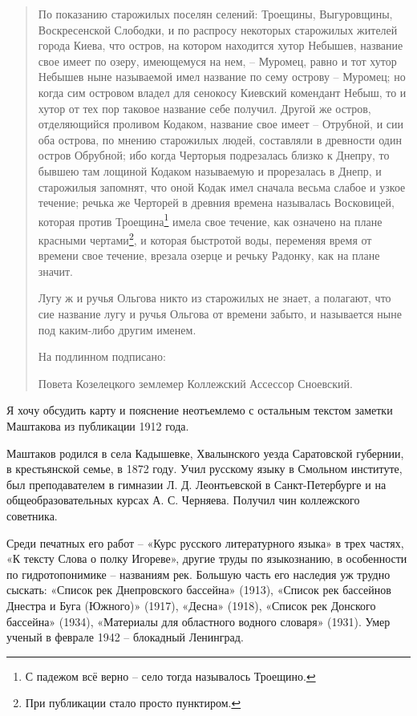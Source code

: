 \begin{quotation}
По показанию старожилых поселян селений: Троещины, Выгуровщины, Воскресенской Слободки, и по распросу некоторых старожилых жителей города Киева, что остров, на котором находится хутор Небышев, название свое имеет по озеру, имеющемуся на нем, – Муромец, равно и тот хутор Небышев ныне называемой имел название по сему острову – Муромец; но когда сим островом владел для сенокосу Киевский комендант Небыш, то и хутор от тех пор таковое название себе получил. Другой же остров, отделяющийся проливом Кодаком, название свое имеет – Отрубной, и сии оба острова, по мнению старожилых людей, составляли в древности один остров Обрубной; ибо когда Черторыя подрезалась близко к Днепру, то бывшею там лощиной Кодаком называемую и прорезалась в Днепр, и старожилыя запомнят, что оной Кодак имел сначала весьма слабое и узкое течение; речька же Черторей в древния времена называлась Восковицей, которая против Троещина\footnote{С падежом всё верно – село тогда называлось Троещино.} имела свое течение, как означено на плане красными чертами\footnote{При публикации стало просто пунктиром.}, и которая быстротой воды, переменяя время от времени свое течение, врезала озерце и речьку Радонку, как на плане значит.

Лугу ж и ручья Ольгова никто из старожилых не знает, а полагают, что сие название лугу и ручья Ольгова от времени забыто, и называется ныне под каким-либо другим именем.

На подлинном подписано:

Повета Козелецкого землемер
Коллежский Ассессор Сноевский.
\end{quotation}

Я хочу обсудить карту и пояснение неотъемлемо с остальным текстом заметки Маштакова из публикации 1912 года.

Маштаков родился в села Кадышевке, Хвалынского уезда Саратовской губернии, в крестьянской семье, в 1872 году. Учил русскому языку в Смольном институте, был преподавателем в гимназии Л. Д.  Леонтьевской в Санкт-Петербурге и на общеобразовательных курсах А. С. Черняева. Получил чин коллежского советника. 

Среди печатных его работ – «Курс русского литературного языка» в трех частях, «К тексту Слова о полку Игореве», другие труды по языкознанию, в особенности по гидротопонимике – названиям рек. Большую часть его наследия уж трудно сыскать: «Список рек Днепровского бассейна» (1913), «Список рек бассейнов Днестра и Буга (Южного)» (1917), «Десна» (1918), «Список рек Донского бассейна» (1934), «Материалы для областного водного словаря» (1931). Умер ученый в феврале 1942 – блокадный Ленинград.

